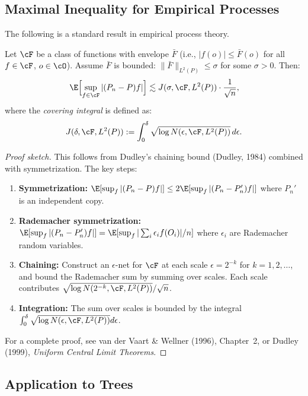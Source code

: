 \subsection{Maximal Inequality for Empirical Processes}

The following is a standard result in empirical process theory.

\begin{theorem}
\label{thm:maximal-ineq}
Let $\cF$ be a class of functions with envelope $\bar{F}$ (i.e., $|f(o)| \le \bar{F}(o)$ for all $f \in \cF$, $o \in \cO$). Assume $\bar{F}$ is bounded: $\|\bar{F}\|_{L^2(P)} \le \sigma$ for some $\sigma > 0$. Then:
\[
\E \Bigl[ \sup_{f \in \cF} |(P_n - P) f| \Bigr] \lesssim J(\sigma, \cF, L^2(P)) \cdot \frac{1}{\sqrt{n}},
\]
where the \emph{covering integral} is defined as:
\[
J(\delta, \cF, L^2(P)) := \int_0^\delta \sqrt{\log N(\epsilon, \cF, L^2(P))} \, d\epsilon.
\]
\end{theorem}

\begin{proof}[Proof sketch]
This follows from Dudley's chaining bound (Dudley, 1984) combined with symmetrization. The key steps:
\begin{enumerate}
\item \textbf{Symmetrization:} $\E[\sup_f |(P_n - P)f|] \le 2 \E[\sup_f |(P_n - P_n') f|]$ where $P_n'$ is an independent copy.
\item \textbf{Rademacher symmetrization:} $\E[\sup_f |(P_n - P_n') f|] = \E[\sup_f |\sum_i \epsilon_i f(O_i)| / n]$ where $\epsilon_i$ are Rademacher random variables.
\item \textbf{Chaining:} Construct an $\epsilon$-net for $\cF$ at each scale $\epsilon = 2^{-k}$ for $k = 1, 2, \ldots$, and bound the Rademacher sum by summing over scales. Each scale contributes $\sqrt{\log N(2^{-k}, \cF, L^2(P))} / \sqrt{n}$.
\item \textbf{Integration:} The sum over scales is bounded by the integral $\int_0^\delta \sqrt{\log N(\epsilon, \cF, L^2(P))} d\epsilon$.
\end{enumerate}
For a complete proof, see van der Vaart \& Wellner (1996), Chapter~2, or Dudley (1999), \emph{Uniform Central Limit Theorems}.
\end{proof}

\subsection{Application to Trees}

